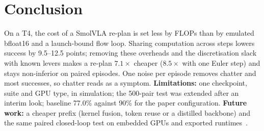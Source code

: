 \section{Conclusion}
\label{sec:conclusion}

On a T4, the cost of a SmolVLA re-plan is set less by FLOPs than by emulated bfloat16 and a launch-bound flow loop.
Sharing computation across steps lowers success by 9.5--12.5 points; removing these overheads and the discretisation slack with known levers makes a re-plan $7.1\times$ cheaper ($8.5\times$ with one Euler step) and stays non-inferior on paired episodes.
One noise per episode removes chatter and most successes, so chatter reads as a symptom.
\textbf{Limitations:} one checkpoint, suite and GPU type, in simulation; the 500-pair test was extended after an interim look; baseline 77.0\% against 90\% for the paper configuration.
\textbf{Future work:} a cheaper prefix (kernel fusion, token reuse or a distilled backbone) and the same paired closed-loop test on embedded GPUs and exported runtimes~\cite{islam2026faster}.
